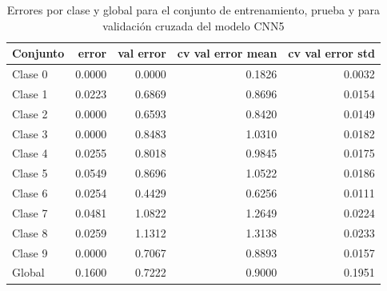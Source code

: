 \documentclass[11pt]{article}
\begin{document}
\begin{table}[h]
    \centering
    \begin{tabular}{lrrrr}
    \toprule
    Conjunto &     error &  val error &  cv val error mean &  cv val error std \\
    \midrule
    Clase 0 &  0.0000 &   0.0000 &           0.1826 &          0.0032 \\
    Clase 1 &  0.0223 &   0.6869 &           0.8696 &          0.0154 \\
    Clase 2 &  0.0000 &   0.6593 &           0.8420 &          0.0149 \\
    Clase 3 &  0.0000 &   0.8483 &           1.0310 &          0.0182 \\
    Clase 4 &  0.0255 &   0.8018 &           0.9845 &          0.0175 \\
    Clase 5 &  0.0549 &   0.8696 &           1.0522 &          0.0186 \\
    Clase 6 &  0.0254 &   0.4429 &           0.6256 &          0.0111 \\
    Clase 7 &  0.0481 &   1.0822 &           1.2649 &          0.0224 \\
    Clase 8 &  0.0259 &   1.1312 &           1.3138 &          0.0233 \\
    Clase 9 &  0.0000 &   0.7067 &           0.8893 &          0.0157 \\
    Global & 0.1600 &     0.7222 &             0.9000 &            0.1951 \\
    \bottomrule
    \end{tabular}
    \caption{Errores por clase y global para el conjunto de entrenamiento, prueba y para validación cruzada del modelo CNN5}
    \label{tab:classError}
\end{table}
\end{document}
